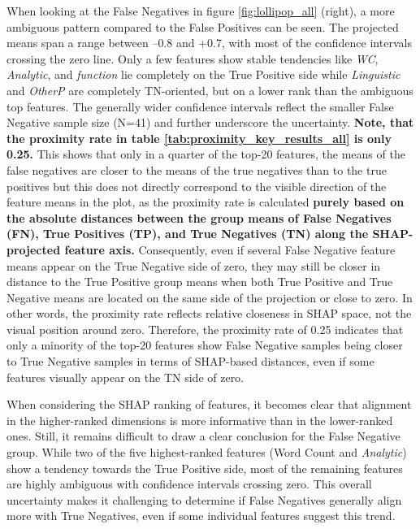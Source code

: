 When looking at the False Negatives in figure \ref{fig:lollipop_all} (right), a more ambiguous pattern compared to the False Positives can be seen. The projected means span a range between –0.8 and +0.7, with most of the confidence intervals crossing the zero line. Only a few features show stable tendencies like \textit{WC},  \textit{Analytic}, and \textit{function} lie completely on the True Positive side while \textit{Linguistic} and \textit{OtherP} are completely TN-oriented, but on a lower rank than the ambiguous top features. The generally wider confidence intervals reflect the smaller False Negative sample size (N=41) and further underscore the uncertainty. \textbf{Note, that the proximity rate in table \ref{tab:proximity_key_results_all} is only 0.25.} This shows that only in a quarter of the top-20 features, the means of the false negatives are closer to the means of the true negatives than to the true positives but this does not directly correspond to the visible direction of the feature means in the plot, as the proximity rate is calculated \textbf{purely based on the absolute distances between the group means of False Negatives (FN), True Positives (TP), and True Negatives (TN) along the SHAP-projected feature axis.} Consequently, even if several False Negative feature means appear on the True Negative side of zero, they may still be closer in distance to the True Positive group means when both True Positive and True Negative means are located on the same side of the projection or close to zero. In other words, the proximity rate reflects relative closeness in SHAP space, not the visual position around zero. Therefore, the proximity rate of 0.25 indicates that only a minority of the top-20 features show False Negative samples being closer to True Negative samples in terms of SHAP-based distances, even if some features visually appear on the TN side of zero.

When considering the SHAP ranking of features, it becomes clear that alignment in the higher-ranked dimensions is more informative than in the lower-ranked ones. Still, it remains difficult to draw a clear conclusion for the False Negative group. While two of the five highest-ranked features ({Word Count} and \textit{Analytic}) show a tendency towards the True Positive side, most of the remaining features are highly ambiguous with confidence intervals crossing zero. This overall uncertainty makes it challenging to determine if False Negatives generally align more with True Negatives, even if some individual features suggest this trend.

